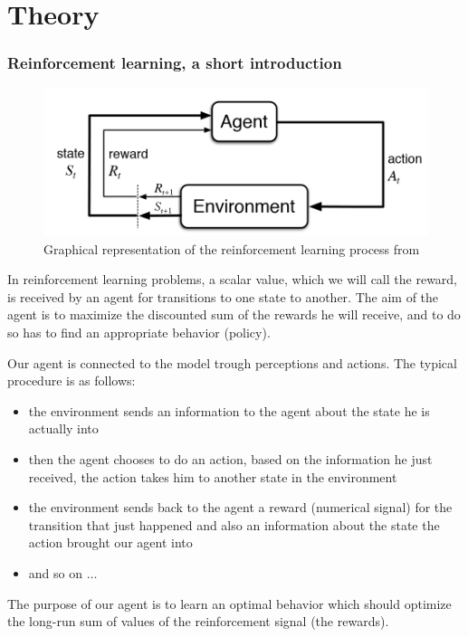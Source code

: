 \documentclass[14pt,a4paper]{article}
\theoremstyle{definition}
\begin{document}
\part*{Theory}
\section{Reinforcement learning, a short introduction}

\begin{figure}[H]
\centering
\includegraphics[scale=0.5]{img/RL_graph.png}
\caption{Graphical representation of the reinforcement learning process from \citep{Sutton}}
\label{RL}
\end{figure}

In reinforcement learning problems, a scalar value, which we will call the reward, is received by an agent for transitions to one state to another. The aim of the agent is to maximize the discounted sum of the rewards he will receive, and to do so has to find an appropriate behavior (policy).


Our agent is connected to the model trough perceptions and actions. The typical procedure is as follows: 
\begin{itemize}
\item the environment sends an information to the agent about the state he is actually into
\item then the agent chooses to do an action, based on the information he just received, the action takes him to another state in the environment
\item the environment sends back to the agent a reward (numerical signal) for the transition that just happened and also an information about the state the action brought our agent into
\item and so on $\ldots$
\end{itemize}

The purpose of our agent is to learn an optimal behavior which should optimize the long-run sum of values of the reinforcement signal (the rewards). \citep{KLMSurvey}
\end{document}
